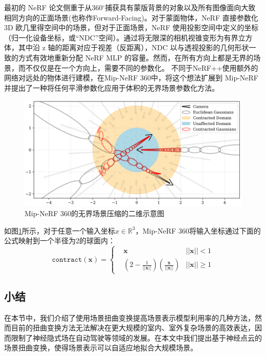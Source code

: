最初的 NeRF 论文侧重于从360$^\circ$捕获具有蒙版背景的对象以及所有图像面向大致相同方向的正面场景(也称作Forward-Facing)。对于蒙面物体，NeRF 直接参数化 3D 欧几里得空间中的场景，但对于正面场景，NeRF 使用投影空间中定义的坐标（归一化设备坐标，或“NDC”空间）。通过将无限深的相机视锥变形为有界立方体，其中沿 z 轴的距离对应于视差（反距离），NDC 以与透视投影的几何形状一致的方式有效地重新分配 NeRF MLP 的容量。然而，在所有方向上都是无界的场景，而不仅仅是在一个方向上，需要不同的参数化。 不同于NeRF++\cite{zhang_nerf_2020}使用额外的网络对远处的物体进行建模，在Mip-NeRF 360\cite{barron_mip-nerf_2022}中，将这个想法扩展到 Mip-NeRF 并提出了一种将任何平滑参数化应用于体积的无界场景参数化方法。

\begin{figure}[ht]
    \centering
    \includegraphics[width=\textwidth]{undergraduate-thesis/images/mipnerf360-contraction.png}
    \caption{Mip-NeRF 360\cite{barron_mip-nerf_2022}的无界场景压缩的二维示意图}
    \label{fig:related-work-unbounded-contraction}
\end{figure}

如图\ref{fig:related-work-unbounded-contraction}所示，对于任意一个输入坐标$x\in\mathbb{R}^3$，Mip-NeRF 360将输入坐标通过下面的公式映射到一个半径为2的球面内：
\begin{equation}
    \mathtt{contract}(\mathbf{x}) = \left\{\begin{matrix}&\mathbf{x}&||\mathbf{x}||<1\\&(2-\frac{1}{||\mathbf{x}||})(\frac{\mathbf{x}}{||\mathbf{x}||})&||\mathbf{x}||\geq1\end{matrix}\right.
\end{equation}

\subsection{小结}
在本节中，我们介绍了使用场景扭曲变换提高场景表示模型利用率的几种方法，然而目前的扭曲变换方法无法解决在更大规模的室内、室外复杂场景的高效表达，因而限制了神经隐式场在自动驾驶等领域的发展。在本文中我们提出基于神经点云的场景扭曲变换，使得场景表示可以自适应地拟合大规模场景。


